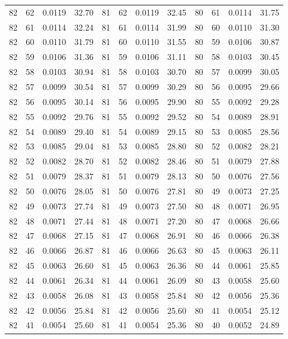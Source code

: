 \begin{tabular}{llll|llll|llll}
82 & 62 & 0.0119 & 32.70 & 81 & 62 & 0.0119 & 32.45 & 80 & 61 & 0.0114 & 31.75\\
82 & 61 & 0.0114 & 32.24 & 81 & 61 & 0.0114 & 31.99 & 80 & 60 & 0.0110 & 31.30\\
82 & 60 & 0.0110 & 31.79 & 81 & 60 & 0.0110 & 31.55 & 80 & 59 & 0.0106 & 30.87\\
82 & 59 & 0.0106 & 31.36 & 81 & 59 & 0.0106 & 31.11 & 80 & 58 & 0.0103 & 30.45\\
82 & 58 & 0.0103 & 30.94 & 81 & 58 & 0.0103 & 30.70 & 80 & 57 & 0.0099 & 30.05\\
82 & 57 & 0.0099 & 30.54 & 81 & 57 & 0.0099 & 30.29 & 80 & 56 & 0.0095 & 29.66\\
82 & 56 & 0.0095 & 30.14 & 81 & 56 & 0.0095 & 29.90 & 80 & 55 & 0.0092 & 29.28\\
82 & 55 & 0.0092 & 29.76 & 81 & 55 & 0.0092 & 29.52 & 80 & 54 & 0.0089 & 28.91\\
82 & 54 & 0.0089 & 29.40 & 81 & 54 & 0.0089 & 29.15 & 80 & 53 & 0.0085 & 28.56\\
82 & 53 & 0.0085 & 29.04 & 81 & 53 & 0.0085 & 28.80 & 80 & 52 & 0.0082 & 28.21\\
82 & 52 & 0.0082 & 28.70 & 81 & 52 & 0.0082 & 28.46 & 80 & 51 & 0.0079 & 27.88\\
82 & 51 & 0.0079 & 28.37 & 81 & 51 & 0.0079 & 28.13 & 80 & 50 & 0.0076 & 27.56\\
82 & 50 & 0.0076 & 28.05 & 81 & 50 & 0.0076 & 27.81 & 80 & 49 & 0.0073 & 27.25\\
82 & 49 & 0.0073 & 27.74 & 81 & 49 & 0.0073 & 27.50 & 80 & 48 & 0.0071 & 26.95\\
82 & 48 & 0.0071 & 27.44 & 81 & 48 & 0.0071 & 27.20 & 80 & 47 & 0.0068 & 26.66\\
82 & 47 & 0.0068 & 27.15 & 81 & 47 & 0.0068 & 26.91 & 80 & 46 & 0.0066 & 26.38\\
82 & 46 & 0.0066 & 26.87 & 81 & 46 & 0.0066 & 26.63 & 80 & 45 & 0.0063 & 26.11\\
82 & 45 & 0.0063 & 26.60 & 81 & 45 & 0.0063 & 26.36 & 80 & 44 & 0.0061 & 25.85\\
82 & 44 & 0.0061 & 26.34 & 81 & 44 & 0.0061 & 26.09 & 80 & 43 & 0.0058 & 25.60\\
82 & 43 & 0.0058 & 26.08 & 81 & 43 & 0.0058 & 25.84 & 80 & 42 & 0.0056 & 25.36\\
82 & 42 & 0.0056 & 25.84 & 81 & 42 & 0.0056 & 25.60 & 80 & 41 & 0.0054 & 25.12\\
82 & 41 & 0.0054 & 25.60 & 81 & 41 & 0.0054 & 25.36 & 80 & 40 & 0.0052 & 24.89\\

\end{tabular}
